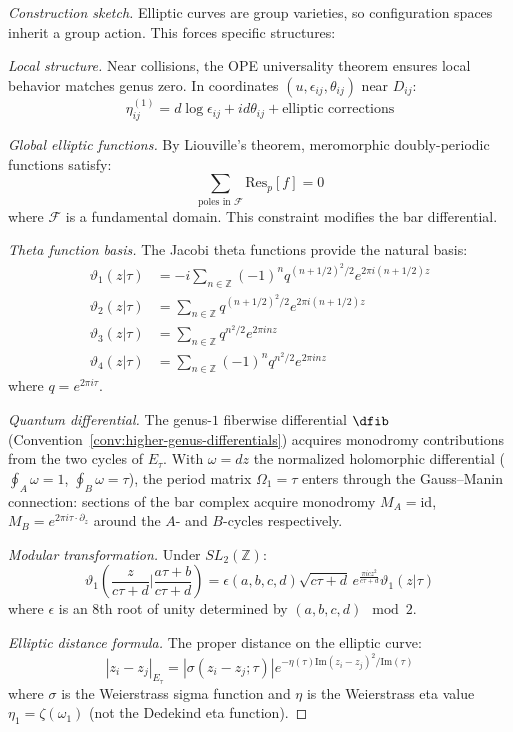 \begin{proof}[Construction sketch]
Elliptic curves are group varieties, so configuration spaces inherit a group action. This forces specific structures:

\emph{Local structure.} Near collisions, the OPE universality theorem ensures local behavior matches genus zero. In coordinates $(u, \epsilon_{ij}, \theta_{ij})$ near $D_{ij}$:
\[\eta_{ij}^{(1)} = d\log\epsilon_{ij} + id\theta_{ij} + \text{elliptic corrections}\]

\emph{Global elliptic functions.} By Liouville's theorem, meromorphic doubly-periodic functions satisfy:
\[\sum_{\text{poles in } \mathcal{F}} \text{Res}_p[f] = 0\]
where $\mathcal{F}$ is a fundamental domain. This constraint modifies the bar differential.

\emph{Theta function basis.} The Jacobi theta functions provide the natural basis:
\begin{align}
\vartheta_1(z|\tau) &= -i\sum_{n \in \mathbb{Z}}(-1)^n q^{(n+1/2)^2/2} e^{2\pi i(n+1/2)z} \\
\vartheta_2(z|\tau) &= \sum_{n \in \mathbb{Z}} q^{(n+1/2)^2/2} e^{2\pi i(n+1/2)z} \\
\vartheta_3(z|\tau) &= \sum_{n \in \mathbb{Z}} q^{n^2/2} e^{2\pi inz} \\
\vartheta_4(z|\tau) &= \sum_{n \in \mathbb{Z}}(-1)^n q^{n^2/2} e^{2\pi inz}
\end{align}
where $q = e^{2\pi i\tau}$.

\emph{Quantum differential.} The genus-$1$ fiberwise differential $\dfib$ (Convention~\ref{conv:higher-genus-differentials}) acquires monodromy contributions from the two cycles of $E_\tau$. With $\omega = dz$ the normalized holomorphic differential ($\oint_A \omega = 1$, $\oint_B \omega = \tau$), the period matrix $\Omega_1 = \tau$ enters through the Gauss--Manin connection: sections of the bar complex acquire monodromy $M_A = \mathrm{id}$, $M_B = e^{2\pi i \tau \cdot \partial_z}$ around the $A$- and $B$-cycles respectively.

\emph{Modular transformation.} Under $SL_2(\mathbb{Z})$:
\[\vartheta_1\left(\frac{z}{c\tau+d}\bigg|\frac{a\tau+b}{c\tau+d}\right) = \epsilon(a,b,c,d)\sqrt{c\tau+d}\,e^{\frac{\pi i cz^2}{c\tau+d}}\vartheta_1(z|\tau)\]
where $\epsilon$ is an 8th root of unity determined by $(a,b,c,d) \mod 2$.

\emph{Elliptic distance formula.} The proper distance on the elliptic curve:
\[|z_i - z_j|_{E_\tau} = |\sigma(z_i - z_j; \tau)|e^{-\eta(\tau)\text{Im}(z_i - z_j)^2/\text{Im}(\tau)}\]
where $\sigma$ is the Weierstrass sigma function and $\eta$ is the Weierstrass eta value $\eta_1 = \zeta(\omega_1)$ (not the Dedekind eta function).
\end{proof}

